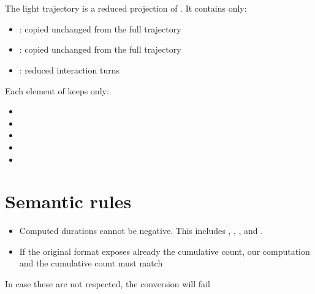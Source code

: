 \documentclass[11pt]{article}
\begin{document}
\section*{\texorpdfstring{}{atif_trajectory_light.json}}

The light trajectory is a reduced projection of .
It contains only:

\begin{itemize}
\item {}: copied unchanged from the full trajectory
\item {}: copied unchanged from the full trajectory
\item {}: reduced interaction turns
\end{itemize}
Each element of  keeps only:
\begin{itemize}
\item {}
\item {}
\item {}
\item {}
\item {}
\end{itemize}

\section*{Semantic rules}
\begin{itemize}
  \item Computed durations cannot be negative. This includes , , , and .
  \item If the original format exposes already the cumulative count, our computation and the cumulative count must match
\end{itemize}
In case these are not respected, the conversion will fail
\end{document}
